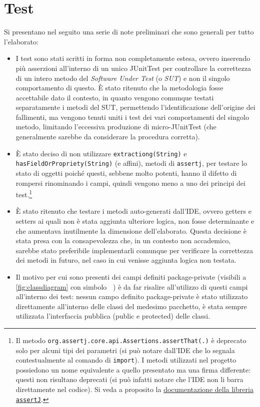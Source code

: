 \documentclass[a4paper,11pt]{article}
\begin{document}
	\section{Test}
	Si presentano nel seguito una serie di note preliminari che sono generali per tutto l'elaborato:
	\begin{itemize}\setlength\itemsep{-3pt}
		\item I test sono stati scritti in forma non completamente estesa, ovvero inserendo più asserzioni all'interno di un unico JUnitTest per controllare la correttezza di un intero metodo del \textit{Software Under Test} (o \textit{SUT}) e non il singolo comportamento di questo. È stato ritenuto che la metodologia fosse accettabile dato il contesto, in quanto vengono comunque testati separatamente i metodi del SUT, permettendo l'identificazione dell'origine dei fallimenti, ma vengono tenuti uniti i test dei vari comportamenti del singolo metodo, limitando l'eccessiva produzione di micro-JUnitTest (che generalmente sarebbe da considerare la procedura corretta).
		\item È stato deciso di non utilizzare \texttt{extractiong(String)} e \texttt{hasFieldOrPropriety(String)} (e affini), metodi di \texttt{assertj}, per testare lo stato di oggetti poiché questi, sebbene molto potenti, hanno il difetto di rompersi rinominando i campi, quindi vengono meno a uno dei principi dei test.\footnote{Il metodo \texttt{org.assertj.core.api.Assertions.assertThat(.)} è deprecato solo per alcuni tipi dei parametri (si può notare dall'IDE che lo segnala contestualmente al comando di \texttt{import}). I metodi utilizzati nel progetto possiedono un nome equivalente a quello presentato ma una firma differente: questi non risultano deprecati (si può infatti notare che l'IDE non li barra direttamente nel codice). Si veda a proposito la \href{https://www.javadoc.io/doc/org.assertj/assertj-core/3.26.0/org/assertj/core/api/Assertions.html}{documentazione della libreria \texttt{assertJ}}.}
		\item È stato ritenuto che testare i metodi auto-generati dall'IDE, ovvero getters e setters ai quali non è stata aggiunta ulteriore logica, non fosse determinante e che aumentava inutilmente la dimensione dell'elaborato. Questa decisione è stata presa con la consapevolezza che, in un contesto non accademico, sarebbe stato preferibile implementarli comunque per verificare la correttezza dei metodi in futuro, nel caso in cui venisse aggiunta logica non testata.
		\item Il motivo per cui sono presenti dei campi definiti package-private (visibili a \ref{fig:classdiagram} con simbolo \textbf{~}) è da far risalire all'utilizzo di questi campi all'interno dei test: nessun campo definito package-private è stato utilizzato direttamente all'interno delle classi del medesimo pacchetto, è stata sempre utilizzata l'interfaccia pubblica (public e protected) delle classi. 
	\end{itemize}
	
	
	
	
\end{document}
